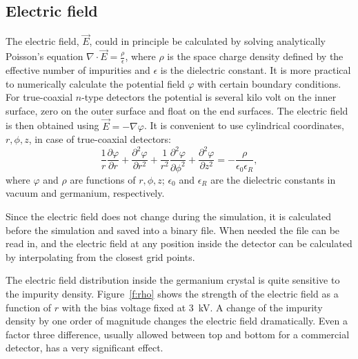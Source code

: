 \documentclass[epj]{svjour}
\begin{document}
\subsection{Electric field}
\label{s:field}
The electric field, $\vec{E}$, could in principle be calculated by
solving analytically Poisson's equation $\nabla \cdot \vec{E} =
\frac{\rho}{\epsilon}$, where $\rho$ is the space charge density
defined by the effective number of impurities and $\epsilon$ is the
dielectric constant. It is more practical to numerically calculate the
potential field $\varphi$ with certain boundary conditions. For
true-coaxial $n$-type detectors the potential is several kilo volt on
the inner surface, zero on the outer surface and float on the end
surfaces. The electric field is then obtained using $\vec{E} = -
\nabla \varphi$. It is convenient to use cylindrical coordinates, $r,
\phi, z$, in case of true-coaxial detectors:
\begin{equation} 
\frac{1}{r} \frac{\partial \varphi}{\partial r} + 
\frac{\partial^{2} \varphi}{\partial r^{2}} + 
\frac{1}{r^{2}} \frac{\partial^{2} \varphi}{\partial \phi^{2}} + 
\frac{\partial^{2} \varphi}{\partial z^{2}} = 
- \frac{\rho}{\epsilon_{0} \epsilon_{R}}, 
\label{e:pocyl} 
\end{equation} 
where $\varphi$ and $\rho$ are functions of $r, \phi, z$;
$\epsilon_{0}$ and $\epsilon_{R}$ are the dielectric constants in
vacuum and germanium, respectively.

Since the electric field does not change during the simulation, it is
calculated before the simulation and saved into a binary file. When
needed the file can be read in, and the electric field at any position
inside the detector can be calculated by interpolating from the
closest grid points.
 
The electric field distribution inside the germanium crystal is quite
sensitive to the impurity density. Figure~\ref{f:rho} shows the
strength of the electric field as a function of $r$ with the bias
voltage fixed at 3~kV. A change of the impurity density by one order
of magnitude changes the electric field dramatically. Even a factor
three difference, usually allowed between top and bottom for a
commercial detector, has a very significant effect.
 
\end{document}
